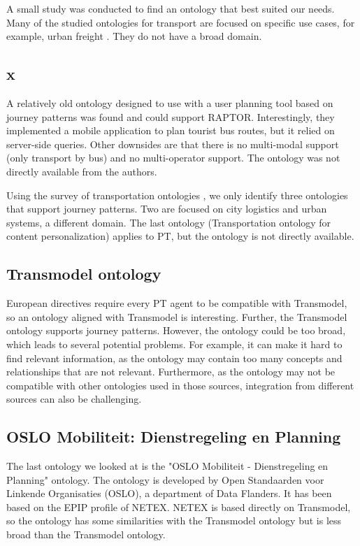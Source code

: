A small study was conducted to find an ontology that best suited our needs. Many of the studied ontologies for transport are focused on specific use cases, for example, urban freight \cite{bouhana_ontology-based_2015}. They do not have a broad domain. 
\subsection{x}
A relatively old ontology designed to use with a user planning tool based on journey patterns \cite{5507372} was found and could support RAPTOR. Interestingly, they implemented a mobile application to plan tourist bus routes, but it relied on server-side queries. Other downsides are that there is no multi-modal support (only transport by bus) and no multi-operator support. The ontology was not directly available from the authors.

Using the survey of transportation ontologies \cite{katsumi_ontologies_2018}, we only identify three ontologies that support journey patterns. Two are focused on city logistics and urban systems, a different domain. The last ontology (Transportation ontology for content personalization) applies to PT, but the ontology is not directly available.

\subsection{Transmodel ontology}
European directives require every PT agent to be compatible with Transmodel, so an ontology aligned with Transmodel is interesting. Further, the Transmodel ontology supports journey patterns. However, the ontology could be too broad, which leads to several potential problems. For example, it can make it hard to find relevant information, as the ontology may contain too many concepts and relationships that are not relevant. Furthermore, as the ontology may not be compatible with other ontologies used in those sources, integration from different sources can also be challenging.

\subsection{OSLO Mobiliteit: Dienstregeling en Planning}
The last ontology we looked at is the "OSLO Mobiliteit - Dienstregeling en Planning" \cite{noauthor_oslo_2023} ontology. The ontology is developed by Open Standaarden voor Linkende Organisaties (OSLO), a department of Data Flanders. It has been based on the EPIP profile of NETEX. NETEX is based directly on  Transmodel, so the ontology has some similarities with the Transmodel ontology but is less broad than the Transmodel ontology.

